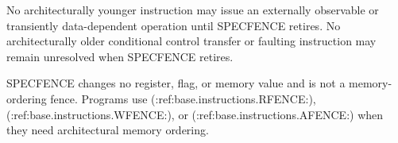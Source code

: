 No architecturally younger instruction may issue an externally observable or transiently data-dependent operation
until SPECFENCE retires. No architecturally older conditional control transfer or faulting instruction may remain
unresolved when SPECFENCE retires.

SPECFENCE changes no register, flag, or memory value and is not a memory-ordering fence. Programs use
(:ref:base.instructions.RFENCE:), (:ref:base.instructions.WFENCE:), or (:ref:base.instructions.AFENCE:) when they
need architectural memory ordering.
